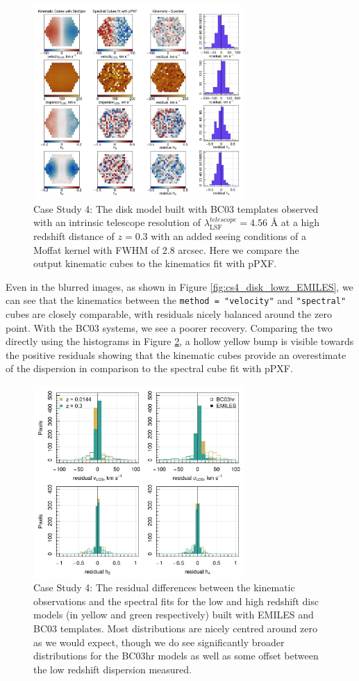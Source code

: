 \documentclass[
  journal=pasa,
  manuscript=research-paper, %
  year=2020,
  volume=37,
]{cup-journal}
\begin{document}
\begin{figure}
    \centering
    \includegraphics[keepaspectratio, width=8cm]{Figures/cs4_disk_velocities_highz_fwhm_blur_BC03.jpeg}
    \caption{Case Study 4: The disk model built with BC03 templates observed with an intrinsic telescope resolution of  $\lambda_{\text{LSF}}^{telescope} = 4.56$ \AA{} at a high redshift distance of $z = 0.3$ with an added seeing conditions of a Moffat kernel with FWHM of 2.8 arcsec. Here we compare the output kinematic cubes to the kinematics fit with pPXF.}
    \label{fig:cs4_disk_highz_BC03}
\end{figure}

Even in the blurred images, as shown in Figure \ref{fig:cs4_disk_lowz_EMILES}, we can see that the kinematics between the \texttt{method = "velocity"} and \texttt{"spectral"} cubes are closely comparable, with residuals nicely balanced around the zero point.
With the BC03 systems, we see a poorer recovery. 
Comparing the two directly using the histograms in Figure \ref{fig:cs4_hist}, a hollow yellow bump is visible towards the positive residuals showing that the kinematic cubes provide an overestimate of the dispersion in comparison to the spectral cube fit with pPXF. 

\begin{figure}
    \centering
    \includegraphics[keepaspectratio, width=8cm]{Figures/cs4_histograms.jpeg}
    \caption{Case Study 4: The residual differences between the kinematic observations and the spectral fits for the low and high redshift disc models (in yellow and green respectively) built with EMILES and BC03 templates. Most distributions are nicely centred around zero as we would expect, though we do see significantly broader distributions for the BC03hr models as well as some offset between the low redshift dispersion measured.}
    \label{fig:cs4_hist}
\end{figure}
\end{document}
